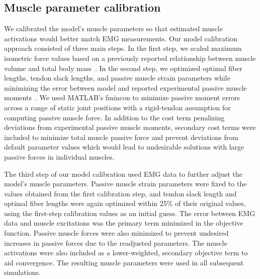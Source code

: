 \documentclass[10pt,letterpaper]{article}
\begin{document}
\subsection*{Muscle parameter calibration}
We calibrated the model’s muscle parameters so that estimated muscle activations would better match EMG measurements. Our model calibration approach consisted of three main steps. In the first step, we scaled maximum isometric force values based on a previously reported relationship between muscle volume and total body mass~\cite{Handsfield:2014}. In the second step, we optimized optimal fiber lengths, tendon slack lengths, and passive muscle strain parameters while minimizing the error between model and reported experimental passive muscle moments~\cite{Silder:2007}. We used MATLAB’s fmincon to minimize passive moment errors across a range of static joint positions with a rigid-tendon assumption for computing passive muscle force. In addition to the cost term penalizing deviations from experimental passive muscle moments, secondary cost terms were included to minimize total muscle passive force and prevent deviations from default parameter values which would lead to undesirable solutions with large passive forces in individual muscles.

The third step of our model calibration used EMG data to further adjust the model’s muscle parameters. Passive muscle strain parameters were fixed to the values obtained from the first calibration step, and tendon slack length and optimal fiber lengths were again optimized within 25\% of their original values, using the first-step calibration values as an initial guess. The error between EMG data and muscle excitations was the primary term minimized in the objective function. Passive muscle forces were also minimized to prevent undesired increases in passive forces due to the readjusted parameters. The muscle activations were also included as a lower-weighted, secondary objective term to aid convergence. The resulting muscle parameters were used in all subsequent simulations.
\end{document}
